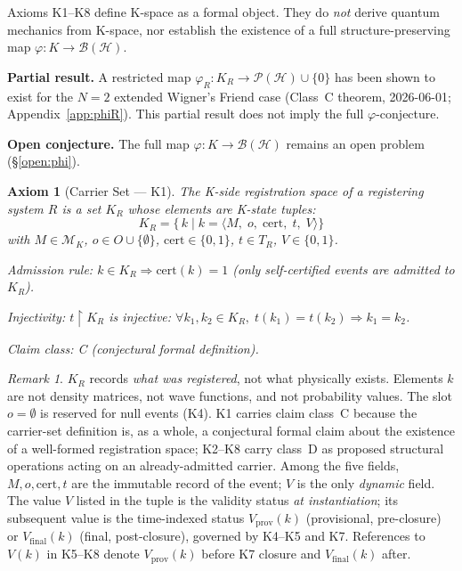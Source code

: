 \documentclass[12pt,a4paper]{article}
\theoremstyle{plain}
\newtheorem{axiom}{Axiom}[section]
\theoremstyle{definition}
\theoremstyle{remark}
\newtheorem{remark}{Remark}[section]
\newcommand{\KR}{K_{\!R}}
\newcommand{\Vp}{V_{\mathrm{prov}}}
\newcommand{\Vf}{V_{\mathrm{final}}}
\newcommand{\bk}[1]{\langle #1 \rangle}
\begin{document}
\begin{tcolorbox}[colback=gray!8,colframe=gray!50,
    title=\textbf{Scope Note},fonttitle=\small,
    breakable]
\small
Axioms K1--K8 define K-space as a formal object. They do \emph{not}
derive quantum mechanics from K-space, nor establish the existence of a full
structure-preserving map $\varphi\colon K \to \mathcal{B}(\mathcal{H})$.

\medskip
\noindent\textbf{Partial result.} A restricted map $\varphi_R\colon K_R \to
\mathcal{P}(\mathcal{H})\cup\{0\}$ has been shown to exist for the $N=2$
extended Wigner's Friend case (Class~C theorem, 2026-06-01;
Appendix~\ref{app:phiR}). This partial result does not imply the full
$\varphi$-conjecture.

\medskip
\noindent\textbf{Open conjecture.} The full map $\varphi\colon K \to
\mathcal{B}(\mathcal{H})$ remains an open problem
(\S\ref{open:phi}).
\end{tcolorbox}

\begin{axiom}[Carrier Set --- K1]\label{ax:K1}
The K-side registration space of a registering system $R$ is a set $\KR$
whose elements are K-state tuples:
\[
  \KR = \bigl\{\, k \;\big|\; k = \bk{M,\; o,\; \mathrm{cert},\; t,\; V} \bigr\}
\]
with $M \in \mathcal{M}_K$, $o \in O \cup \{\emptyset\}$,
$\mathrm{cert} \in \{0,1\}$, $t \in T_R$, $V \in \{0,1\}$.

\smallskip
\noindent\textit{Admission rule}: $k \in \KR \Rightarrow \mathrm{cert}(k) = 1$
(only self-certified events are admitted to $\KR$).

\noindent\textit{Injectivity}: $t\!\upharpoonright\!\KR$ is injective:
$\forall k_1,k_2 \in \KR,\; t(k_1) = t(k_2) \Rightarrow k_1 = k_2$.

\smallskip
\noindent\textit{Claim class}: C (conjectural formal definition).
\end{axiom}

\begin{remark}
$\KR$ records \emph{what was registered}, not what physically exists.
Elements $k$ are not density matrices, not wave functions, and not probability
values. The slot $o = \emptyset$ is reserved for null events (K4).
K1 carries claim class~C because the carrier-set definition is, as a whole,
a conjectural formal claim about the existence of a well-formed registration
space; K2--K8 carry class~D as proposed structural operations acting on an
already-admitted carrier.
Among the five fields, $M,o,\mathrm{cert},t$ are the immutable record of the
event; $V$ is the only \emph{dynamic} field. The value $V$ listed in the tuple
is the validity status \emph{at instantiation}; its subsequent value is the
time-indexed status $\Vp(k)$ (provisional, pre-closure) or $\Vf(k)$ (final,
post-closure), governed by K4--K5 and K7. References to $V(k)$ in K5--K8 denote
$\Vp(k)$ before K7 closure and $\Vf(k)$ after.
\end{remark}
\end{document}
